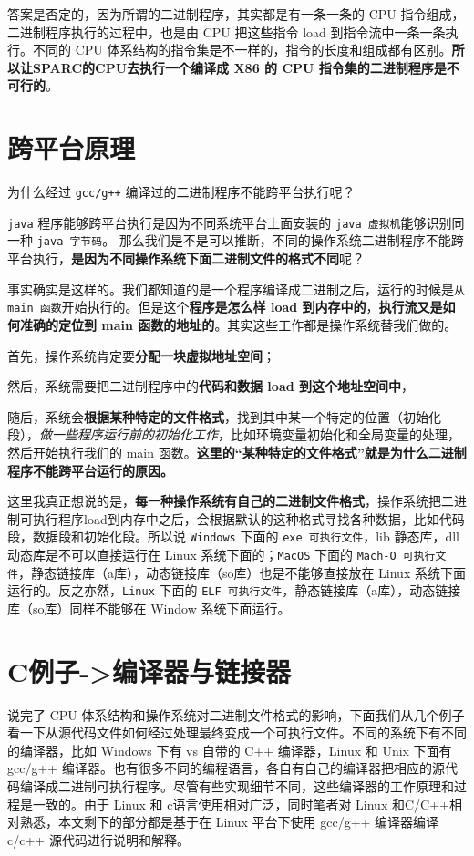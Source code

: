 \documentclass[UTF8,a4paper,12pt]{ctexbook}
\begin{document}
		答案是否定的，因为所谓的二进制程序，其实都是有一条一条的 CPU 指令组成，二进制程序执行的过程中，也是由 CPU 把这些指令 load 到指令流中一条一条执行。不同的 CPU 体系结构的指令集是不一样的，指令的长度和组成都有区别。\textbf{所以让SPARC的CPU去执行一个编译成 X86 的 CPU 指令集的二进制程序是不可行的}。
	
	
	\section{跨平台原理}
		为什么经过 \verb|gcc/g++| 编译过的二进制程序不能跨平台执行呢？
		
		\verb|java| 程序能够跨平台执行是因为不同系统平台上面安装的 \verb|java 虚拟机|能够识别同一种 \verb|java 字节码|。
		那么我们是不是可以推断，不同的操作系统二进制程序不能跨平台执行，\textbf{是因为不同操作系统下面二进制文件的格式不同}呢？
		
		事实确实是这样的。我们都知道的是一个程序编译成二进制之后，运行的时候是\verb|从 main 函数|开始执行的。但是这个\textbf{程序是怎么样 load 到内存中的}，\textbf{执行流又是如何准确的定位到 main 函数的地址的}。其实这些工作都是操作系统替我们做的。
		
		首先，操作系统肯定要\textbf{分配一块虚拟地址空间}；
		
		然后，系统需要把二进制程序中的\textbf{代码和数据 load 到这个地址空间中}，
		
		随后，系统会\textbf{根据某种特定的文件格式}，找到其中某一个特定的位置（初始化段），\textit{做一些程序运行前的初始化工作}，比如环境变量初始化和全局变量的处理，然后开始执行我们的 main 函数。\textbf{这里的“某种特定的文件格式”就是为什么二进制程序不能跨平台运行的原因。}
		
		这里我真正想说的是，\textbf{每一种操作系统有自己的二进制文件格式}，操作系统把二进制可执行程序load到内存中之后，会根据默认的这种格式寻找各种数据，比如代码段，数据段和初始化段。所以说 \verb|Windows| 下面的 \verb|exe 可执行文件|，lib 静态库，dll 动态库是不可以直接运行在 Linux 系统下面的；\verb|MacOS| 下面的 \verb|Mach-O 可执行文件|，静态链接库（a库），动态链接库（so库）也是不能够直接放在 Linux 系统下面运行的。反之亦然，\verb|Linux| 下面的 \verb|ELF 可执行文件|，静态链接库（a库），动态链接库（so库）同样不能够在 Window 系统下面运行。
	
	\section{C例子->编译器与链接器}
		说完了 CPU 体系结构和操作系统对二进制文件格式的影响，下面我们从几个例子看一下从源代码文件如何经过处理最终变成一个可执行文件。不同的系统下有不同的编译器，比如 Windows 下有 vs 自带的 C++ 编译器，Linux 和 Unix 下面有 gcc/g++ 编译器。也有很多不同的编程语言，各自有自己的编译器把相应的源代码编译成二进制可执行程序。尽管有些实现细节不同，这些编译器的工作原理和过程是一致的。由于 Linux 和 c语言使用相对广泛，同时笔者对 Linux 和C/C++相对熟悉，本文剩下的部分都是基于在 Linux 平台下使用 gcc/g++ 编译器编译 c/c++ 源代码进行说明和解释。
		
\end{document}
